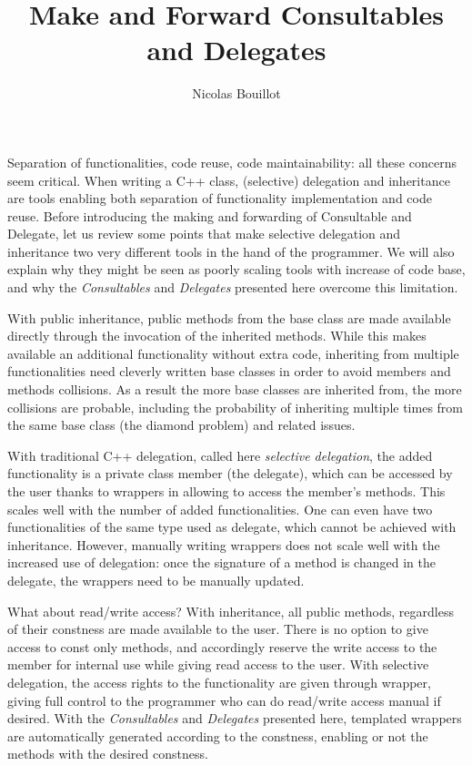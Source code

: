 \documentclass{article}
\begin{document}
\title{Make and Forward Consultables and Delegates}
\author{Nicolas Bouillot}
\maketitle

Separation of functionalities, code reuse, code maintainability: all these concerns seem critical. When writing a C++ class, (selective) delegation and inheritance are tools enabling both separation of functionality implementation and code reuse. Before introducing the making and forwarding of Consultable and Delegate, let us review some points that make selective delegation and inheritance two very different tools in the hand of the programmer. We will also explain why they might be seen as poorly scaling tools with increase of code base, and why the \textit{Consultables} and \textit{Delegates} presented here overcome this limitation.

With public inheritance, public methods from the base class are made available directly through the invocation of the inherited methods. While this makes available an additional functionality without extra code, inheriting from multiple functionalities need cleverly written base classes in order to avoid members and methods collisions. As a result the more base classes are inherited from, the more collisions are probable, including the probability of inheriting multiple times from the same base class (the diamond problem) and related issues.

With traditional C++ delegation, called here \textit{selective delegation}, the added functionality is a private class member (the delegate), which can be accessed by the user thanks to wrappers in allowing to access the member's methods. This scales well with the number of added functionalities. One can even have two functionalities of the same type used as delegate, which cannot be achieved with inheritance. However, manually writing wrappers does not scale well with the increased use of delegation: once the signature of a method is changed in the delegate, the wrappers need to be manually updated.  
 
What about read/write access? With inheritance, all public methods, regardless of their constness are made available to the user. There is no option to give access to const only methods, and accordingly reserve the write access to the member for internal use while giving read access to the user. With selective delegation, the access rights to the functionality are given through wrapper, giving full control to the programmer who can do read/write access manual if desired. With the \textit{Consultables} and \textit{Delegates} presented here, templated wrappers are automatically generated according to the constness, enabling or not the methods with the desired constness. 
\end{document}
